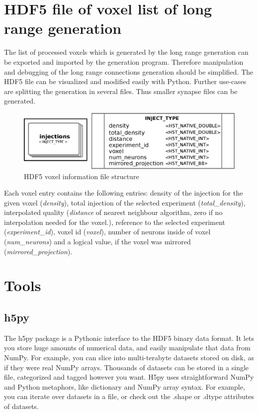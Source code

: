 \chapter{HDF5 file of voxel list of long range generation}
\label{file:voxelinfo}
The list of processed voxels which is generated by the long range generation can be exported and imported
by the generation program. Therefore manipulation and debugging of the long range connections generation should be
simplified. The HDF5 file can be visualized and modified easily with Python. Further use-cases are 
splitting the generation in several files. Thus smaller synapse files can be generated.

\begin{figure}[ht!]
\centering
\includegraphics[scale=0.6]{pictures/hdf5_voxel_format.eps}
\caption{HDF5 voxel information file structure}
\end{figure}

Each voxel entry contains the following entries: density of the injection for the given voxel (\emph{density}),
total injection of the selected experiment (\emph{total\_density}),
interpolated quality (\emph{distance} of nearest neighbour algorithm, zero if no interpolation needed for the voxel.),
reference to the selected experiment (\emph{experiment\_id}),
voxel id (\emph{voxel}),
number of neurons inside of voxel (\emph{num\_neurons}) and
a logical value, if the voxel was mirrored (\emph{mirrored\_projection}).



\chapter{Tools}

\section{h5py}
\label{sec:h5py}
The h5py package is a Pythonic interface to the HDF5 binary data format.
It lets you store huge amounts of numerical data, and easily manipulate that data from NumPy. For example, you can slice into multi-terabyte datasets stored on disk, as if they were real NumPy arrays. Thousands of datasets can be stored in a single file, categorized and tagged however you want.
H5py uses straightforward NumPy and Python metaphors, like dictionary and NumPy array syntax. For example, you can iterate over datasets in a file, or check out the .shape or .dtype attributes of datasets. \cite{h5py}

